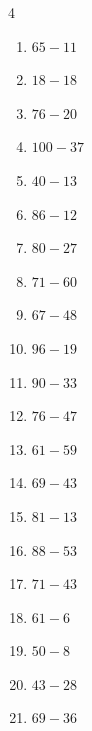 \begin{multicols}{4}
\begin{enumerate}
  \item $65-11$
        \phantom{$=54$}

  \item $18-18$
        \phantom{$=0$}

  \item $76-20$
        \phantom{$=56$}

  \item $100-37$
        \phantom{$=63$}

  \item $40-13$
        \phantom{$=27$}

  \item $86-12$
        \phantom{$=74$}

  \item $80-27$
        \phantom{$=53$}

  \item $71-60$
        \phantom{$=11$}

  \item $67-48$
        \phantom{$=19$}

  \item $96-19$
        \phantom{$=77$}

  \item $90-33$
        \phantom{$=57$}

  \item $76-47$
        \phantom{$=29$}

  \item $61-59$
        \phantom{$=2$}

\columnbreak %

\resetques

  \item $69-43$
        \phantom{$=26$}

  \item $81-13$
        \phantom{$=68$}

  \item $88-53$
        \phantom{$=35$}

  \item $71-43$
        \phantom{$=28$}

  \item $61-6$
        \phantom{$=55$}

  \item $50-8$
        \phantom{$=42$}

  \item $43-28$
        \phantom{$=15$}

  \item $69-36$
        \phantom{$=33$}


\end{enumerate}
\end{multicols}
